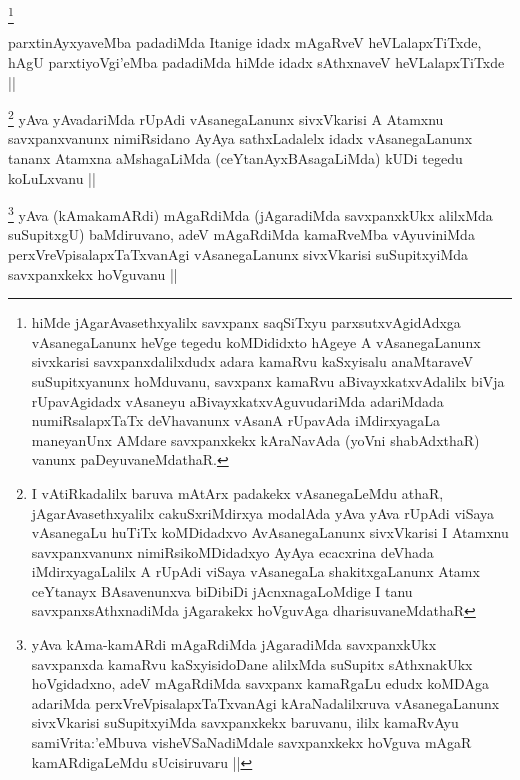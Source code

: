
\begin{artha}
\footnote{hiMde jAgarAvasethxyalilx savxpanx saqSiTxyu parxsutxvAgidAdxga vAsanegaLanunx heVge tegedu koMDididxto hAgeye A vAsanegaLanunx sivxkarisi savxpanxdalilxdudx adara kamaRvu kaSxyisalu anaMtaraveV suSupitxyanunx hoMduvanu, savxpanx kamaRvu aBivayxkatxvAdalilx biVja rUpavAgidadx vAsaneyu aBivayxkatxvAguvudariMda adariMdada numiRsalapxTaTx deVhavanunx vAsanA rUpavAda iMdirxyagaLa maneyanUnx AMdare savxpanxkekx kAraNavAda (yoVni shabAdxthaR) vanunx paDeyuvaneMdathaR.}
\end{artha}


\begin{artha}
parxtinAyxyaveMba padadiMda Itanige \footnotemark idadx mAgaRveV heVLalapxTiTxde, hAgU parxtiyoVgi'eMba padadiMda \footnotemark hiMde idadx sAthxnaveV heVLalapxTiTxde ||
\end{artha}


\begin{artha}
\footnote{I vAtiRkadalilx baruva mAtArx padakekx vAsanegaLeMdu athaR, jAgarAvasethxyalilx cakuSxriMdirxya modalAda yAva yAva rUpAdi viSaya vAsanegaLu huTiTx koMDidadxvo AvAsanegaLanunx sivxVkarisi I Atamxnu savxpanxvanunx nimiRsikoMDidadxyo AyAya ecacxrina deVhada iMdirxyagaLalilx A rUpAdi viSaya vAsanegaLa shakitxgaLanunx Atamx ceYtanayx BAsavenunxva biDibiDi jAcnxnagaLoMdige I tanu savxpanxsAthxnadiMda jAgarakekx hoVguvAga dharisuvaneMdathaR}
yAva yAvadariMda rUpAdi vAsanegaLanunx sivxVkarisi A Atamxnu savxpanxvanunx nimiRsidano AyAya sathxLadalelx idadx vAsanegaLanunx tananx Atamxna aMshagaLiMda (ceYtanAyxBAsagaLiMda) kUDi tegedu koLuLxvanu ||
\end{artha}


\begin{artha}
\footnote{yAva kAma-kamARdi mAgaRdiMda jAgaradiMda savxpanxkUkx savxpanxda kamaRvu kaSxyisidoDane alilxMda suSupitx sAthxnakUkx hoVgidadxno, adeV mAgaRdiMda savxpanx kamaRgaLu edudx koMDAga adariMda perxVreVpisalapxTaTxvanAgi kAraNadalilxruva vAsanegaLanunx sivxVkarisi suSupitxyiMda savxpanxkekx baruvanu, ililx kamaRvAyu samiVrita:'eMbuva visheVSaNadiMdale savxpanxkekx hoVguva mAgaR kamARdigaLeMdu sUcisiruvaru ||}
yAva (kAmakamARdi) mAgaRdiMda (jAgaradiMda savxpanxkUkx alilxMda suSupitxgU) baMdiruvano, adeV mAgaRdiMda kamaRveMba vAyuviniMda perxVreVpisalapxTaTxvanAgi vAsanegaLanunx sivxVkarisi suSupitxyiMda savxpanxkekx hoVguvanu ||
\end{artha}

